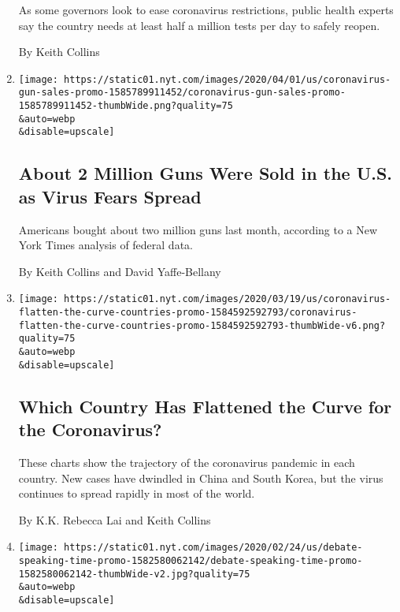 \begin{enumerate}
  As some governors look to ease coronavirus restrictions, public health
  experts say the country needs at least half a million tests per day to
  safely reopen.

  By Keith Collins
\item
  \href{/interactive/2020/04/01/business/coronavirus-gun-sales.html}{}

  \texttt{[image: https://static01.nyt.com/images/2020/04/01/us/coronavirus-gun-sales-promo-1585789911452/coronavirus-gun-sales-promo-1585789911452-thumbWide.png?quality=75\\\&auto=webp\\\&disable=upscale]}

  \hypertarget{about-2-million-guns-were-sold-in-the-us-as-virus-fears-spread}{%
  \subsection{About 2 Million Guns Were Sold in the U.S. as Virus Fears
  Spread}\label{about-2-million-guns-were-sold-in-the-us-as-virus-fears-spread}}

  Americans bought about two million guns last month, according to a New
  York Times analysis of federal data.

  By Keith Collins and David Yaffe-Bellany
\item
  \href{/interactive/2020/03/19/world/coronavirus-flatten-the-curve-countries.html}{}

  \texttt{[image: https://static01.nyt.com/images/2020/03/19/us/coronavirus-flatten-the-curve-countries-promo-1584592592793/coronavirus-flatten-the-curve-countries-promo-1584592592793-thumbWide-v6.png?quality=75\\\&auto=webp\\\&disable=upscale]}

  \hypertarget{which-country-has-flattened-the-curve-for-the-coronavirus}{%
  \subsection{Which Country Has Flattened the Curve for the
  Coronavirus?}\label{which-country-has-flattened-the-curve-for-the-coronavirus}}

  These charts show the trajectory of the coronavirus pandemic in each
  country. New cases have dwindled in China and South Korea, but the
  virus continues to spread rapidly in most of the world.

  By K.K. Rebecca Lai and Keith Collins
\item
  \href{/interactive/2020/02/25/us/elections/debate-speaking-time.html}{}

  \texttt{[image: https://static01.nyt.com/images/2020/02/24/us/debate-speaking-time-promo-1582580062142/debate-speaking-time-promo-1582580062142-thumbWide-v2.jpg?quality=75\\\&auto=webp\\\&disable=upscale]}


\end{enumerate}
